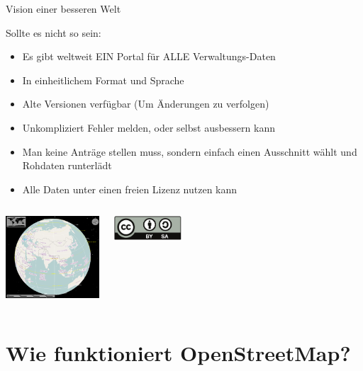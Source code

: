 \documentclass{beamer}
\begin{document}
\begin{frame}{Vision einer besseren Welt}

 Sollte es nicht so sein:
  \begin{itemize}
    \item Es gibt weltweit EIN Portal für ALLE Verwaltungs-Daten 
    \item In einheitlichem Format und Sprache
    \item Alte Versionen verfügbar (Um Änderungen zu verfolgen)
    \item Unkompliziert Fehler melden, oder selbst ausbessern kann
\pause
    \item Man keine Anträge stellen muss, sondern einfach einen Ausschnitt wählt und Rohdaten runterlädt
    \item Alle Daten unter einen freien Lizenz nutzen kann
  \end{itemize}

  \begin{columns}[c]
        \begin{center}
  \includegraphics[width=3.5cm]{marble.png}
  \end{center}
      \begin{center}
    \includegraphics[width=2.5cm]{cc-by-sa.pdf}
  \end{center}
\end{columns}

\end{frame}


\section{Wie funktioniert OpenStreetMap?}
\end{document}
